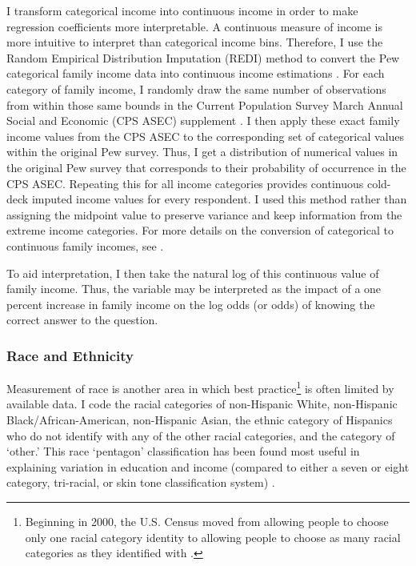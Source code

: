 \documentclass[11pt]{article}
\begin{document}
I transform categorical income into continuous income in order to make regression coefficients more interpretable. A continuous measure of income is more intuitive to interpret than categorical income bins. Therefore, I use the Random Empirical Distribution Imputation (REDI) method to convert the Pew categorical family income data into continuous income estimations \citep{KingREDI}. For each category of family income, I randomly draw the same number of observations from within those same bounds in the Current Population Survey March Annual Social and Economic (CPS ASEC) supplement \citep{ASEC2018}. I then apply these exact family income values from the CPS ASEC to the corresponding set of categorical values within the original Pew survey. Thus, I get a distribution of numerical values in the original Pew survey that corresponds to their probability of occurrence in the CPS ASEC. Repeating this for all income categories provides continuous cold-deck imputed income values for every respondent. I used this method rather than assigning the midpoint value to preserve variance and keep information from the extreme income categories. For more details on the conversion of categorical to continuous family incomes, see \citet{KingREDI}.

To aid interpretation, I then take the natural log of this continuous value of family income. Thus, the variable may be interpreted as the impact of a one percent increase in family income on the log odds (or odds) of knowing the correct answer to the question.


\subsubsection{Race and Ethnicity}\label{sec:race-and-ethnicity}

Measurement of race is another area in which best practice\footnote
  {Beginning in 2000, the U.S. Census moved from allowing people to choose only one racial category identity to allowing people to choose as many racial categories as they identified with \citep{OfficeofManagementandBudget1997,OfficeofManagementandBudget2000}.}
is often limited by available data. I code the racial categories of non-Hispanic White, non-Hispanic Black/African-American, non-Hispanic Asian, the ethnic category of Hispanics who do not identify with any of the other racial categories, and the category of `other.' This race `pentagon' classification has been found most useful in explaining variation in education and income (compared to either a seven or eight category, tri-racial, or skin tone classification system) \citep{Howell2017}.
\end{document}
